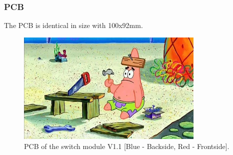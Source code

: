     \subsubsection{PCB}
    
    The PCB is identical in size with 100x92mm. 
        \begin{figure}[H]
            \centering
            \includegraphics[width=0.8\textwidth]{assets/HW/TBD.png}
            \caption{PCB of the switch module V1.1 [Blue - Backside, Red - Frontside].}
        \end{figure}